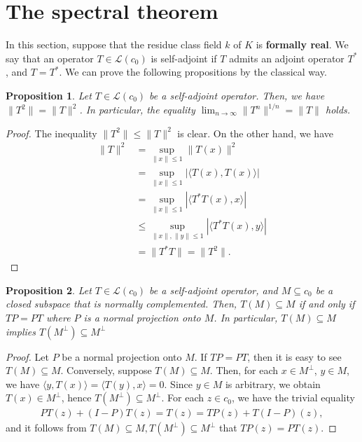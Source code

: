 \documentclass[12pt]{amsart}
\theoremstyle{plain}
\newtheorem{prop} {Proposition} [section]
\theoremstyle{definition}
\begin{document}
\section{The spectral theorem} \label{a}

In this section, suppose that the residue class field $k$ of $K$ is \textbf{formally real}. We say that an operator $T \in \mathcal{L}(c_0)$ is self-adjoint if $T$ admits an adjoint operator $T^*$, and $T = T^*$. We can prove the following propositions by the classical way.

\begin{prop} \label{a2}
  Let $T \in \mathcal{L}(c_0)$ be a self-adjoint operator. Then, we have $\| T ^2\| = \|T\|^2$. In particular, the equality $\lim_{n \to \infty} \|T^n\|^{1/n} = \|T\|$ holds. 
\end{prop}
\begin{proof}
  The inequality $\| T ^2\| \le \|T\|^2$ is clear. On the other hand, we have
  \begin{align*}
    \|T\|^2 &= \sup_{\|x\| \le 1} \|T(x)\|^2 \\
    &= \sup_{\|x\| \le 1} | \langle T(x), T(x) \rangle | \\
    &= \sup_{\|x\| \le 1} | \langle T^*T(x), x \rangle | \\
    &\le \sup_{\|x\|, \|y\| \le 1} |\langle T^*T(x), y \rangle | \\
    &= \|T^*T\| = \|T^2\|.
  \end{align*}
\end{proof}

\begin{prop} \label{a4}
  Let $T \in \mathcal{L}(c_0)$ be a self-adjoint operator, and $M \subseteq c_0$ be a closed subspace that is normally complemented. Then, $T(M) \subseteq M$ if and only if $TP = PT$ where $P$ is a normal projection onto $M$. In particular, $T(M) \subseteq M$ implies $T(M^{\perp}) \subseteq M^{\perp}$
\end{prop}
\begin{proof}
  Let $P$ be a normal projection onto $M$. If $TP = PT$, then it is easy to see $T(M) \subseteq M$. Conversely, suppose $T(M) \subseteq M$. Then, for each $x \in M^{\perp}$, $y \in M$, we have $\langle y, T(x) \rangle = \langle T(y), x \rangle =0$. Since $y \in M$ is arbitrary, we obtain $T(x) \in M^{\perp}$, hence $T(M^{\perp}) \subseteq M^{\perp}$. For each $z \in c_0$, we have the trivial equality
  \begin{align*}
    PT(z) + (I - P)T(z) = T(z) = TP(z) + T(I - P)(z),
  \end{align*}
  and it follows from $T(M) \subseteq M, T(M^{\perp}) \subseteq M^{\perp}$ that $TP(z) = PT(z)$.
\end{proof}
\end{document}
